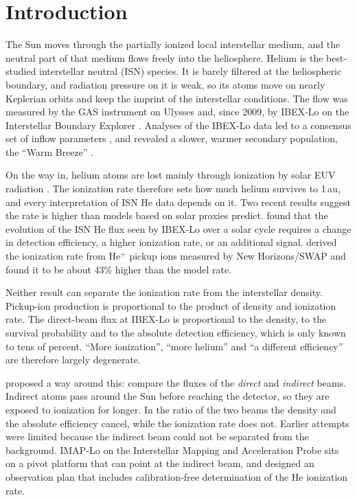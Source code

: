 \documentclass[10pt,a4paper,twocolumn]{article}
\begin{document}
\section{Introduction}
\label{sec:intro}

The Sun moves through the partially ionized local interstellar medium, and
the neutral part of that medium flows freely into the heliosphere. Helium is
the best-studied interstellar neutral (ISN) species. It is barely filtered at
the heliospheric boundary, and radiation pressure on it is weak, so its atoms
move on nearly Keplerian orbits and keep the imprint of the interstellar
conditions. The flow was measured by the GAS instrument on Ulysses
\citep{Witte2004} and, since 2009, by IBEX-Lo on the Interstellar Boundary
Explorer \citep{McComas2009,Fuselier2009,Mobius2009}. Analyses of the IBEX-Lo
data \citep{Bzowski2012,Lee2012} led to a consensus set of inflow parameters
\citep{McComas2015}, and revealed a slower, warmer secondary population, the
``Warm Breeze'' \citep{Kubiak2014}.

On the way in, helium atoms are lost mainly through ionization by solar EUV
radiation \citep{Sokol2019}. The ionization rate therefore sets how much
helium survives to 1\,au, and every interpretation of ISN He data depends on
it. Two recent results suggest the rate is higher than models based on solar
proxies predict. \citet{Swaczyna2022} found that the evolution of the ISN He
flux seen by IBEX-Lo over a solar cycle requires a change in detection
efficiency, a higher ionization rate, or an additional signal.
\citet{Antonik2025} derived the ionization rate from He$^+$ pickup ions
measured by New Horizons/SWAP and found it to be about 43\% higher than the
model rate.

Neither result can separate the ionization rate from the interstellar
density. Pickup-ion production is proportional to the product of density and
ionization rate. The direct-beam flux at IBEX-Lo is proportional to the
density, to the survival probability and to the absolute detection
efficiency, which is only known to tens of percent. ``More ionization'',
``more helium'' and ``a different efficiency'' are therefore largely
degenerate.

\citet{Bzowski2023} proposed a way around this: compare the fluxes of the
\emph{direct} and \emph{indirect} beams. Indirect atoms pass around the Sun
before reaching the detector, so they are exposed to ionization for longer.
In the ratio of the two beams the density and the absolute efficiency cancel,
while the ionization rate does not. Earlier attempts were limited because the
indirect beam could not be separated from the background. IMAP-Lo on the
Interstellar Mapping and Acceleration Probe \citep{McComas2018} sits on a
pivot platform that can point at the indirect beam, and \citet{Kubiak2023}
designed an observation plan that includes calibration-free determination of
the He ionization rate.
\end{document}
